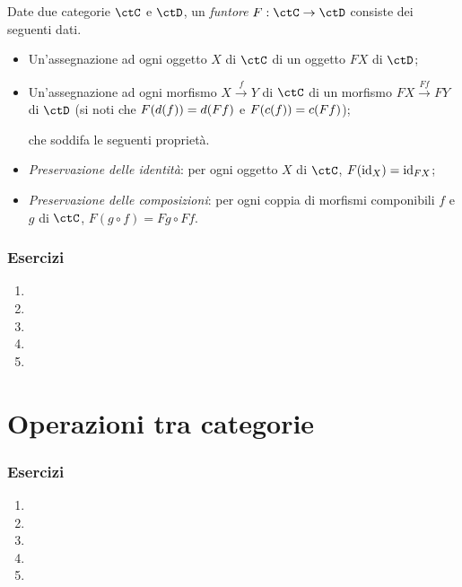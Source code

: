 \begin{definition}
 Date due categorie $\ctC$ e $\ctD$, un \emph{funtore} $F:\ctC\to\ctD$ consiste dei seguenti dati.
 \begin{itemize}
  \item Un'assegnazione ad ogni oggetto $X$ di $\ctC$ di un oggetto $FX$ di $\ctD$;
  \item Un'assegnazione ad ogni morfismo $X \xrightarrow{f} Y$ di $\ctC$ di un morfismo $FX \xrightarrow{Ff} FY$ di $\ctD$ (si noti che $F(d(f))=d(Ff)$ e $F(c(f))=c(Ff)$);

  che soddifa le seguenti proprietà.
  \item \emph{Preservazione delle identità}: per ogni oggetto $X$ di $\ctC$, $F(\mathrm{id}_X)=\mathrm{id}_{FX}$;
  \item \emph{Preservazione delle composizioni}: per ogni coppia di morfismi componibili $f$ e $g$ di $\ctC$, $F(g\circ f)=Fg\circ Ff$.
 \end{itemize}
\end{definition}




\subsubsection*{Esercizi}
\begin{enumerate}
    \item
    \item
    \item
    \item
    \item
\end{enumerate}


\section{Operazioni tra categorie}


\subsubsection*{Esercizi}
\begin{enumerate}
    \item
    \item
    \item
    \item
    \item
\end{enumerate}


